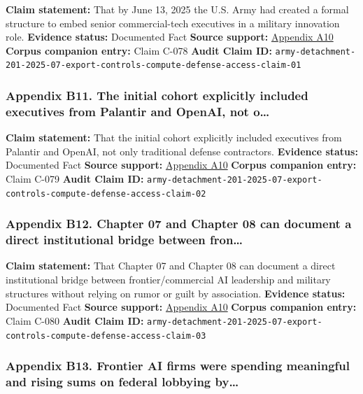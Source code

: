 \documentclass[
  american,
  11pt,
  letterpaper,
]{article}
\begin{document}
\textbf{Claim statement:} That by June 13, 2025 the U.S. Army had
created a formal structure to embed senior commercial-tech executives in
a military innovation role. \textbf{Evidence status:} Documented Fact
\textbf{Source support:}
\hyperref[appendix-a10-army-launches-detachment-201-executive-innovation-corps-to-drive-tech-transformation]{Appendix
A10} \textbf{Corpus companion entry:} Claim C-078 \textbf{Audit Claim
ID:}
\texttt{army-detachment-201-2025-07-export-controls-compute-defense-access-claim-01}

\subsubsection{Appendix B11. The initial cohort explicitly included
executives from Palantir and OpenAI, not
o\ldots{}}\label{appendix-b11-the-initial-cohort-explicitly-included-executives-from-palantir-and-openai-not-o}

\textbf{Claim statement:} That the initial cohort explicitly included
executives from Palantir and OpenAI, not only traditional defense
contractors. \textbf{Evidence status:} Documented Fact \textbf{Source
support:}
\hyperref[appendix-a10-army-launches-detachment-201-executive-innovation-corps-to-drive-tech-transformation]{Appendix
A10} \textbf{Corpus companion entry:} Claim C-079 \textbf{Audit Claim
ID:}
\texttt{army-detachment-201-2025-07-export-controls-compute-defense-access-claim-02}

\subsubsection{Appendix B12. Chapter 07 and Chapter 08 can document a
direct institutional bridge between
fron\ldots{}}\label{appendix-b12-chapter-07-and-chapter-08-can-document-a-direct-institutional-bridge-between-fron}

\textbf{Claim statement:} That Chapter 07 and Chapter 08 can document a
direct institutional bridge between frontier/commercial AI leadership
and military structures without relying on rumor or guilt by
association. \textbf{Evidence status:} Documented Fact \textbf{Source
support:}
\hyperref[appendix-a10-army-launches-detachment-201-executive-innovation-corps-to-drive-tech-transformation]{Appendix
A10} \textbf{Corpus companion entry:} Claim C-080 \textbf{Audit Claim
ID:}
\texttt{army-detachment-201-2025-07-export-controls-compute-defense-access-claim-03}

\subsubsection{Appendix B13. Frontier AI firms were spending meaningful
and rising sums on federal lobbying
by\ldots{}}\label{appendix-b13-frontier-ai-firms-were-spending-meaningful-and-rising-sums-on-federal-lobbying-by}
\end{document}

